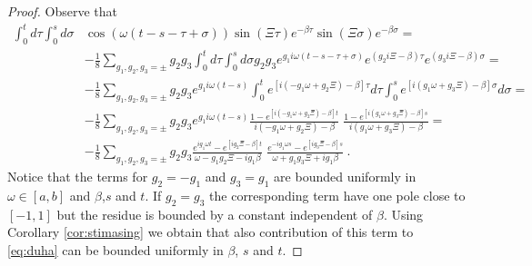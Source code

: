 \documentclass[11pt]{article}
\numberwithin{equation}{section}
\numberwithin{theorem}{section}
\newcommand{\dam}{\beta}
\begin{document}
\begin{proof} Observe that
\begin{equation}\label{eq:contr1}
\begin{aligned}
\int_0^td\tau\int_0^sd\sigma&
\cos(\omega(t-s-\tau+\sigma))
\sin(\Xi\tau)e^{-\dam \tau}\sin(\Xi\sigma)e^{-\dam \sigma}=\\
&-\frac 18\sum_{g_1,g_2,g_3=\pm}g_2g_3\int_0^td\tau\int_0^sd\sigma
g_2g_3e^{g_1i\omega(t-s-\tau+\sigma)}
e^{(g_2i\Xi-\dam)\tau}
e^{(g_3i\Xi-\dam)\sigma}=\\
&-\frac 18\sum_{g_1,g_2,g_3=\pm}g_2g_3e^{g_1i\omega(t-s)}
\int_0^t e^{[i(-g_1\omega+g_2\Xi)-\dam]\tau}d\tau
\int_0^s e^{[i(g_1\omega+g_3\Xi)-\dam]\sigma}d\sigma=\\
&-\frac 18\sum_{g_1,g_2,g_3=\pm}g_2g_3e^{g_1i\omega(t-s)}
\frac{1-e^{[i(-g_1\omega+g_2\Xi)-\dam]t}}
{i(-g_1\omega+g_2\Xi)-\dam}\;
\frac{1-e^{[i(g_1\omega+g_3\Xi)-\dam]s}}
{i(g_1\omega+g_3\Xi)-\dam}=\\
&-\frac 18\sum_{g_1,g_2,g_3=\pm}g_2g_3
\frac{e^{ig_1\omega t}-e^{[ig_2\Xi-\dam]t}}
{\omega-g_1g_2\Xi-ig_1\dam}\;
\frac{e^{-ig_1\omega s}-e^{[ig_3\Xi-\dam]s}}
{\omega+g_1g_3\Xi+ig_1\dam}\ .
\end{aligned}
\end{equation}
Notice that the terms for  $g_2=-g_1$ and $g_3=g_1$ are bounded
uniformly in $\omega\in[a,b]$ and $\dam$,$s$ and $t$. If $g_2=g_3$ the
corresponding term have one pole
close to $[-1,1]$ but the residue is 
bounded
by a constant independent of $\dam$. Using Corollary \ref{cor:stimasing} we obtain that also contribution of this
term to \eqref{eq:duha} can be bounded uniformly in $\dam$, $s$ and $t$. 


\end{proof}
\end{document}
